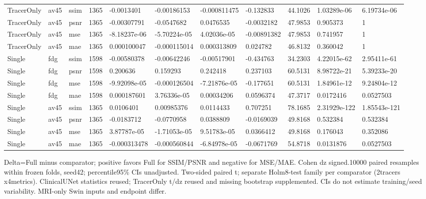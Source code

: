 \begin{landscape}
\begin{longtable}{lllllllllll}
TracerOnly & av45 & ssim & 1365 & -0.0013401 & -0.00186153 & -0.000811475 & -0.132833 & 44.1026 & 1.03289e-06 & 6.19734e-06 \\
TracerOnly & av45 & psnr & 1365 & -0.00307791 & -0.0547682 & 0.0476535 & -0.0032182 & 47.9853 & 0.905373 & 1 \\
TracerOnly & av45 & mse & 1365 & -8.18237e-06 & -5.70224e-05 & 4.02036e-05 & -0.00891382 & 47.9853 & 0.741957 & 1 \\
TracerOnly & av45 & mae & 1365 & 0.000100047 & -0.000115014 & 0.000313809 & 0.024782 & 46.8132 & 0.360042 & 1 \\
Single & fdg & ssim & 1598 & -0.00580378 & -0.00642246 & -0.00517901 & -0.434763 & 34.2303 & 4.22015e-62 & 2.95411e-61 \\
Single & fdg & psnr & 1598 & 0.200636 & 0.159293 & 0.242418 & 0.237103 & 60.5131 & 8.98722e-21 & 5.39233e-20 \\
Single & fdg & mse & 1598 & -9.92098e-05 & -0.000126504 & -7.21876e-05 & -0.177651 & 60.5131 & 1.84961e-12 & 9.24804e-12 \\
Single & fdg & mae & 1598 & 0.000187601 & 3.76336e-05 & 0.00034206 & 0.0596374 & 47.3717 & 0.0172416 & 0.0527503 \\
Single & av45 & ssim & 1365 & 0.0106401 & 0.00985376 & 0.0114433 & 0.707251 & 78.1685 & 2.31929e-122 & 1.85543e-121 \\
Single & av45 & psnr & 1365 & -0.0183712 & -0.0770958 & 0.0388809 & -0.0169039 & 49.8168 & 0.532384 & 0.532384 \\
Single & av45 & mse & 1365 & 3.87787e-05 & -1.71053e-05 & 9.51783e-05 & 0.0366412 & 49.8168 & 0.176043 & 0.352086 \\
Single & av45 & mae & 1365 & -0.000313478 & -0.000560844 & -6.84978e-05 & -0.0671769 & 54.8718 & 0.0131876 & 0.0527503 \\
\end{longtable}
\noindent\parbox{\linewidth}{\footnotesize Delta=Full minus comparator; positive favors Full for SSIM/PSNR and negative for MSE/MAE. Cohen dz signed.10000 paired resamples within frozen folds, seed42; percentile95\% CIs unadjusted. Two-sided paired t; separate Holm8-test family per comparator (2tracers x4metrics). ClinicalUNet statistics reused; TracerOnly t/dz reused and missing bootstrap supplemented. CIs do not estimate training/seed variability. MRI-only Swin inputs and endpoint differ.}
\endgroup
\end{landscape}
